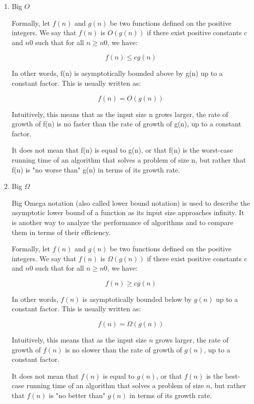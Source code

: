 \documentclass{article}
\begin{document}
\begin{enumerate}
\begin{enumerate}
    \item Big  $O$ 
    
    Formally, let $f(n)$ and $g(n)$ be two functions defined on the positive integers. We say that $f(n)$ is $O(g(n))$ if there exist positive constants $c$ and $n0$ such that for all $n \geq n0$, we have:

    $$f(n) \leq c g(n)$$
    
    In other words, f(n) is asymptotically bounded above by g(n) up to a constant factor. This is usually written as:
    
    $$f(n) = O(g(n))$$
    
    Intuitively, this means that as the input size n grows larger, the rate of growth of f(n) is no faster than the rate of growth of g(n), up to a constant factor. 
    
    It does not mean that f(n) is equal to g(n), or that f(n) is the worst-case running time of an algorithm that solves a problem of size n, but rather that f(n) is "no worse than" g(n) in terms of its growth rate.

    \item Big $\Omega$

    Big Omega notation (also called lower bound notation) is used to describe the asymptotic lower bound of a function as its input size approaches infinity. It is another way to analyze the performance of algorithms and to compare them in terms of their efficiency.

    Formally, let $f(n)$ and $g(n)$ be two functions defined on the positive integers. We say that $f(n)$ is $\Omega(g(n))$ if there exist positive constants $c$ and $n0$ such that for all $n \geq n0$, we have:

    $$f(n) \geq c g(n)$$

    In other words, $f(n)$ is asymptotically bounded below by $g(n)$ up to a constant factor. This is usually written as:

    $$f(n) = \Omega(g(n))$$

    Intuitively, this means that as the input size $n$ grows larger, the rate of growth of $f(n)$ is no slower than the rate of growth of $g(n)$, up to a constant factor. 
    
    It does not mean that $f(n)$ is equal to $g(n)$, or that $f(n)$ is the best-case running time of an algorithm that solves a problem of size $n$, but rather that $f(n)$ is "no better than" $g(n)$ in terms of its growth rate.


\end{enumerate}
\end{enumerate}
\end{document}
